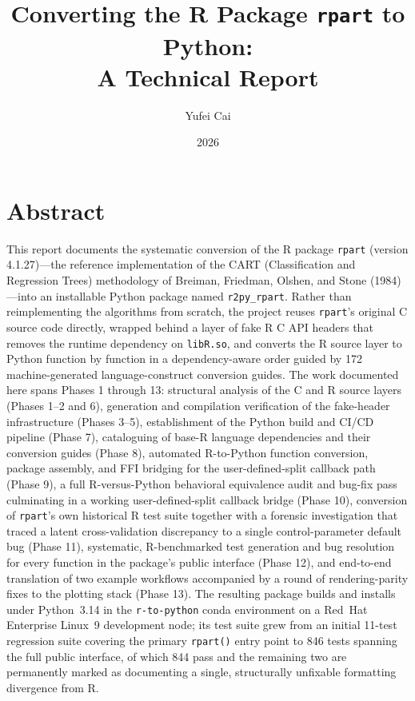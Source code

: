 \documentclass[12pt]{article}
\title{Converting the R Package \texttt{rpart} to Python:\\A Technical Report}
\author{Yufei Cai}
\date{2026}
\begin{document}
\maketitle
\tableofcontents
\newpage

\section*{Abstract}
\label{sec:abstract}

This report documents the systematic conversion of the R package \texttt{rpart} (version 4.1.27)---the reference implementation of the CART (Classification and Regression Trees) methodology of Breiman, Friedman, Olshen, and Stone (1984)---into an installable Python package named \texttt{r2py\_rpart}. Rather than reimplementing the algorithms from scratch, the project reuses \texttt{rpart}'s original C source code directly, wrapped behind a layer of fake R C API headers that removes the runtime dependency on \texttt{libR.so}, and converts the R source layer to Python function by function in a dependency-aware order guided by 172 machine-generated language-construct conversion guides. The work documented here spans Phases 1 through 13: structural analysis of the C and R source layers (Phases 1--2 and 6), generation and compilation verification of the fake-header infrastructure (Phases 3--5), establishment of the Python build and CI/CD pipeline (Phase 7), cataloguing of base-R language dependencies and their conversion guides (Phase 8), automated R-to-Python function conversion, package assembly, and FFI bridging for the user-defined-split callback path (Phase 9), a full R-versus-Python behavioral equivalence audit and bug-fix pass culminating in a working user-defined-split callback bridge (Phase 10), conversion of \texttt{rpart}'s own historical R test suite together with a forensic investigation that traced a latent cross-validation discrepancy to a single control-parameter default bug (Phase 11), systematic, R-benchmarked test generation and bug resolution for every function in the package's public interface (Phase 12), and end-to-end translation of two example workflows accompanied by a round of rendering-parity fixes to the plotting stack (Phase 13). The resulting package builds and installs under Python~3.14 in the \texttt{r-to-python} conda environment on a Red~Hat Enterprise Linux~9 development node; its test suite grew from an initial 11-test regression suite covering the primary \texttt{rpart()} entry point to 846 tests spanning the full public interface, of which 844 pass and the remaining two are permanently marked as documenting a single, structurally unfixable formatting divergence from R.
\end{document}
